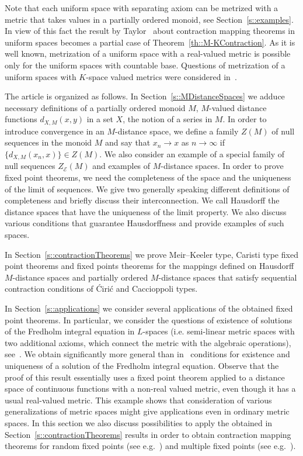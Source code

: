 \documentclass[12pt]{amsart}          %
\newcommand{\EE}{\mathcal{E}}
\begin{document}
Note that each uniform space with separating axiom can be metrized with a metric that takes values in a partially ordered monoid, see  Section~\ref{s::examples}. {In view of this fact the result by Taylor~\cite{Taylor} about contraction mapping theorems in uniform spaces becomes a partial case of Theorem~\ref{th::M-KContraction}}. As it is well known, metrization of a uniform space with a real-valued metric is possible only for the uniform spaces with countable base. Questions of metrization of a uniform spaces with $K$-space valued metrics were considered in~\cite{Kusraev}.

The article is organized as follows. 
In Section~\ref{s::MDistanceSpaces} we adduce necessary definitions of a partially ordered monoid $M$, $M$-valued distance functions $d_{X,M}(x,y)$ in a set $X$, the notion of a series in $M$. In order to introduce convergence in an $M$-distance space, we define a family $Z(M)$ of null sequences in the monoid $M$ and say that $x_n\to x$ as $n\to\infty$ if $\{ d_{X,M}(x_n,x)\}\in Z(M)$. We also consider an example of a special family of null sequences $Z_{\EE}(M)$ and examples of $M$-distance spaces. {In order to prove fixed point theorems, we need the completeness of the space and the uniqueness of the limit of sequences. We give two generally speaking different definitions of completeness and briefly discuss their interconnection. We call Hausdorff the distance spaces that have the uniqueness of the limit property. We also discuss various conditions that guarantee Hausdorffness and provide examples of such spaces.}

In Section~\ref{s::contractionTheorems} 
we prove {Meir--Keeler type, Caristi type} fixed point theorems and fixed points theorems  for the mappings defined on Hausdorff $M$-distance spaces and partially ordered $M$-distance spaces that satisfy sequential contraction conditions of \'Ciri\'c and Caccioppoli types.

In Section~\ref{s::applications} we consider several applications of the obtained fixed point theorems. In particular, we consider the 
 questions of existence of solutions of the Fredholm integral equation in $L$-spaces (i.e. semi-linear metric spaces with two additional axioms, which connect the metric with the algebraic operations), see~\cite{Vahrameev, Babenko19, Babenko20, Babenko21}. We obtain significantly more general than in~\cite{Babenko19} conditions for existence and uniqueness of a solution of the  Fredholm integral equation. Observe that the proof of this result essentially uses a fixed point theorem applied to a distance space of continuous functions with a non-real valued metric, even though it has a usual real-valued metric. This example shows that consideration of various generalizations of metric spaces might give applications even in ordinary metric spaces.
In this section we also discuss possibilities to apply the obtained in Section~\ref{s::contractionTheorems} results in order to obtain contraction mapping theorems for random fixed points (see e.g.~\cite{Nietoatall}) and multiple fixed points (see e.g.~\cite{ChobanBerinde}).
\end{document}
